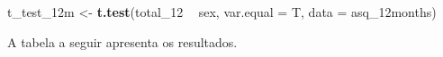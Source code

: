 \documentclass[
]{book}
\newenvironment{Shaded}{\begin{snugshade}}{\end{snugshade}}
\newcommand{\DataTypeTok}[1]{\textcolor[rgb]{0.13,0.29,0.53}{#1}}
\newcommand{\DecValTok}[1]{\textcolor[rgb]{0.00,0.00,0.81}{#1}}
\newcommand{\KeywordTok}[1]{\textcolor[rgb]{0.13,0.29,0.53}{\textbf{#1}}}
\newcommand{\NormalTok}[1]{#1}
\newcommand{\OperatorTok}[1]{\textcolor[rgb]{0.81,0.36,0.00}{\textbf{#1}}}
\newcommand{\OtherTok}[1]{\textcolor[rgb]{0.56,0.35,0.01}{#1}}
\newcommand{\StringTok}[1]{\textcolor[rgb]{0.31,0.60,0.02}{#1}}
\begin{document}
\begin{Shaded}
\begin{Highlighting}[]
\NormalTok{t_test_12m <-}\StringTok{ }\KeywordTok{t.test}\NormalTok{(total_}\DecValTok{12} \OperatorTok{~}\StringTok{ }\NormalTok{sex, }\DataTypeTok{var.equal =}\NormalTok{ T, }
                     \DataTypeTok{data =}\NormalTok{ asq_12months)}
\end{Highlighting}
\end{Shaded}

A tabela a seguir apresenta os resultados.

\begin{Shaded}
\end{Shaded}
\end{document}
